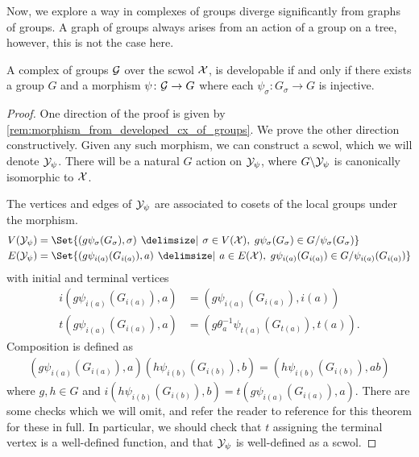 Now, we explore a way in complexes of groups diverge significantly from graphs of groups.
A graph of groups always arises from an action of a group on a tree, however, this is not the case here.
\begin{theorem}
	A complex of groups $\mathcal{G}$ over the scwol $\mathcal{X}$, is developable if and only if there exists a group $G$ and a morphism $\psi \colon \mathcal{G} \to G$ where each $\psi_\sigma \colon G_\sigma \to G$ is injective.
	\label{thm:complex_of_groups_developable_iff_injective}
\end{theorem}
\begin{proof}
	One direction of the proof is given by \cref{rem:morphism_from_developed_cx_of_groups}.
	We prove the other direction constructively.
	Given any such morphism, we can construct a scwol, which we will denote $\mathcal{Y}_\psi$.
	There will be a natural $G$ action on $\mathcal{Y}_\psi$, where $G \backslash \mathcal{Y}_\psi$ is canonically isomorphic to $\mathcal{X}$.

	The vertices and edges of $\mathcal{Y}_\psi$ are associated to cosets of the local groups under the morphism.
	\begin{align*}
		V(\caly_\psi) & = \Set{(g\psi_\sigma(G_\sigma), \sigma) \given \sigma \in V(\calx), \; g\psi_\sigma(G_\sigma) \in G / \psi_\sigma(G_\sigma)} \\
		E(\caly_\psi) & = \Set{(g\psi_{i(a)}(G_{i(a)}), a) \given a \in E(\calx), \; g\psi_{i(a)}(G_{i(a)}) \in G / \psi_{i(a)}(G_{i(a)})}
	\end{align*}
	with initial and terminal vertices
	\begin{align*}
		i(g\psi_{i(a)}(G_{i(a)}), a) & = (g\psi_{i(a)}(G_{i(a)}), i(a))              \\
		t(g\psi_{i(a)}(G_{i(a)}), a) & = (g\theta_a^{-1}\psi_{t(a)}(G_{t(a)}), t(a))
		.\end{align*}
	Composition is defined as
	\begin{align*}
		(g\psi_{i(a)}(G_{i(a)}), a)(h\psi_{i(b)}(G_{i(b)}), b) = (h\psi_{i(b)}(G_{i(b)}), ab)
	\end{align*}
	where $g,h \in G$ and $i(h\psi_{i(b)}(G_{i(b)}), b) = t(g\psi_{i(a)}(G_{i(a)}), a)$.
	There are some checks which we will omit, and refer the reader to reference for this theorem for these in full.
	In particular, we should check that $t$ assigning the terminal vertex is a well-defined function, and that $\mathcal{Y}_\psi$ is well-defined as a scwol.


\end{proof}
